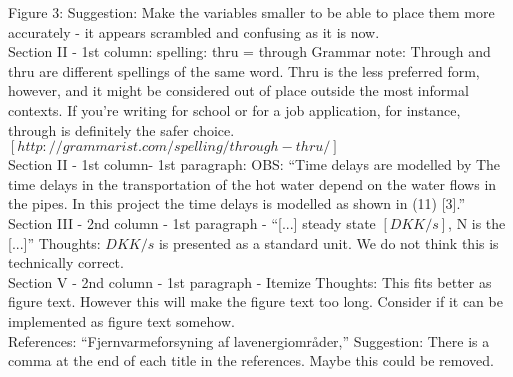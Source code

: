 \noindent Figure 3: Suggestion: Make the variables smaller to be able to place them more accurately - it appears scrambled and confusing as it is now.\\


\noindent Section II - 1st column: spelling: thru = through
Grammar note: Through and thru are different spellings of the same word. Thru is the less preferred form, however, and it might be considered out of place outside the most informal contexts. If you’re writing for school or for a job application, for instance, through is definitely the safer choice. $[http://grammarist.com/spelling/through-thru/]$\\


\noindent Section II - 1st column- 1st paragraph: OBS: “Time delays are modelled by The time delays in the transportation of the hot water depend on the water flows in the pipes. In this project the time delays is modelled as shown in (11) [3].”\\


\noindent Section III - 2nd column - 1st paragraph - “[...] steady state $[DKK/s]$, N is the [...]”
Thoughts: $DKK/s$ is presented as a standard unit. We do not think this is technically correct.\\


\noindent Section V - 2nd column - 1st paragraph - Itemize						
Thoughts: This fits better as figure text. However this will make the figure text too long. Consider if it can be implemented as figure text somehow. \\


\noindent References: “Fjernvarmeforsyning af lavenergiområder,”
Suggestion: There is a comma at the end of each title in the references. Maybe this could be removed. \\


